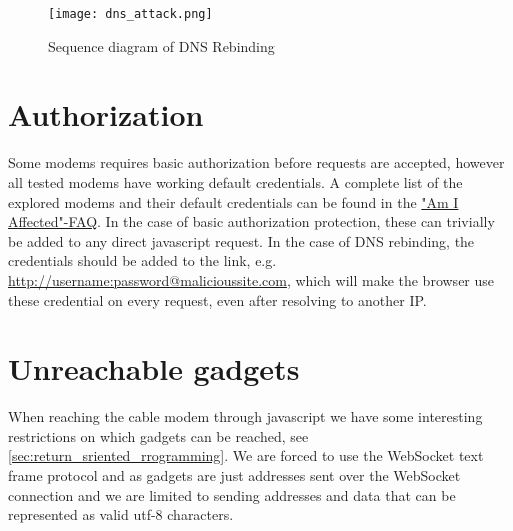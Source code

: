\begin{figure}
  \texttt{[image: dns\_attack.png]}
  \caption{Sequence diagram of DNS Rebinding}
  \label{fig:dns_attack}
\end{figure}

\section{Authorization}
Some modems requires basic authorization before requests are accepted, however all tested modems have working default credentials.
A complete list of the explored modems and their default credentials can be found in the \href{https://cablehaunt.com/#faq-am-i-affected}{"Am I Affected"-FAQ}.
In the case of basic authorization protection, these can trivially be added to any direct javascript request.
In the case of DNS rebinding, the credentials should be added to the link, e.g. \url{http://username:password@malicioussite.com}, which will make the browser use these credential on every request, even after resolving to another IP. 

\section{Unreachable gadgets}
When reaching the cable modem through javascript we have some interesting restrictions on which gadgets can be reached, see \cref{sec:return_sriented_rrogramming}. We are forced to use the WebSocket text frame protocol and as gadgets are just addresses sent over the WebSocket connection and we are limited to sending addresses and data that can be represented as valid utf-8 characters.


